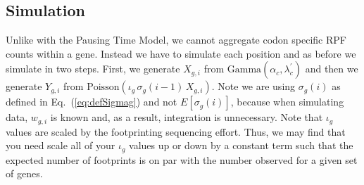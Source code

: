 \documentclass{article}
\newcommand{\elongWaitTime}{\ensuremath{w}\xspace}
\newcommand{\wgi}{\ensuremath{\elongWaitTime_{g,i}}\xspace}
\newcommand{\WaitTerm}{\ensuremath{X}\xspace} %
\newcommand{\Xgi}{\ensuremath{\WaitTerm_{g,i}}\xspace}
\newcommand{\alphac}{\ensuremath{{\alpha_c}}\xspace}
\newcommand{\lambdacprime}{\ensuremath{{\lambda_c^\prime}}\xspace}
\newcommand{\sigmag}{\ensuremath{\sigma_{g}}\xspace}
\newcommand{\sigmagi}{\ensuremath{\sigma_{g}(i)}\xspace}
\newcommand{\Esigmagi}{\ensuremath{E\left[\sigma_{g}(i)\right]}\xspace}
\newcommand{\Esigmagimone}{\ensuremath{E\left[\sigma_{g}(i-1)\right]}\xspace}
\newcommand{\iotag}{\ensuremath{{\iota_g}}\xspace}
\newcommand{\Ygi}{\ensuremath{{Y_{g,i}}}\xspace}
\begin{document}


\subsection*{Simulation}
Unlike with the Pausing Time Model, we cannot aggregate codon specific RPF counts within a gene.
Instead we have to simulate each position and as before we simulate in two steps.
First, we generate $\Xgi$  from $\text{Gamma}(\alphac, \lambdacprime)$ and then we generate $\Ygi$ from $\text{Poisson}\left(\iotag \, \sigmag(i-1)\, \Xgi\right)$.
Note we are using $\sigmagi$ as defined in Eq.~(\ref{eq:defSigmag}) and not $\Esigmagi$, because when simulating data, $\wgi$ is known and, as a result, integration is unnecessary.
Note that $\iotag$ values are scaled by the footprinting sequencing effort.
Thus, we may find that you need scale all of your $\iotag$ values up or down by a constant term such that the expected number of footprints is on par with the number observed for a given set of genes.
\end{document}
